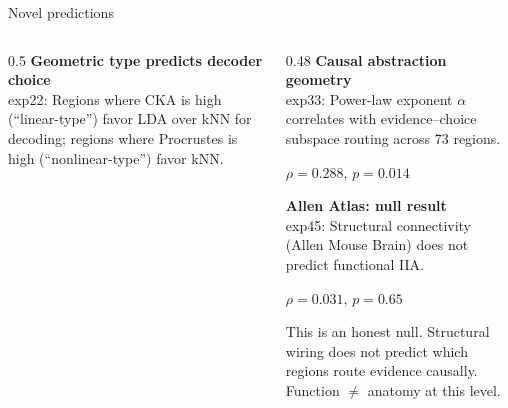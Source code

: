 \documentclass[aspectratio=169,11pt]{beamer}
\begin{document}
\begin{frame}{Novel predictions}
\begin{columns}[T]
\begin{column}{0.5\textwidth}
\textbf{Geometric type predicts decoder choice}\\[0.3em]
{\small exp22: Regions where CKA is high (``linear-type'')
favor LDA over kNN for decoding; regions where Procrustes
is high (``nonlinear-type'') favor kNN.}

\vspace{0.5em}

\end{column}
\begin{column}{0.48\textwidth}
\textbf{Causal abstraction geometry}\\[0.3em]
{\small exp33: Power-law exponent $\alpha$ correlates with
evidence--choice subspace routing across 73 regions.}

\vspace{0.3em}
$\rho = 0.288$, $p = 0.014$

\vspace{0.8em}
\textbf{Allen Atlas: null result}\\[0.3em]
{\small exp45: Structural connectivity (Allen Mouse Brain)
does not predict functional IIA.}

\vspace{0.3em}
$\rho = 0.031$, $p = 0.65$

\vspace{0.3em}
{\small This is an honest null. Structural wiring does
not predict which regions route evidence causally.
Function $\neq$ anatomy at this level.}
\end{column}
\end{columns}
\end{frame}
\end{document}
